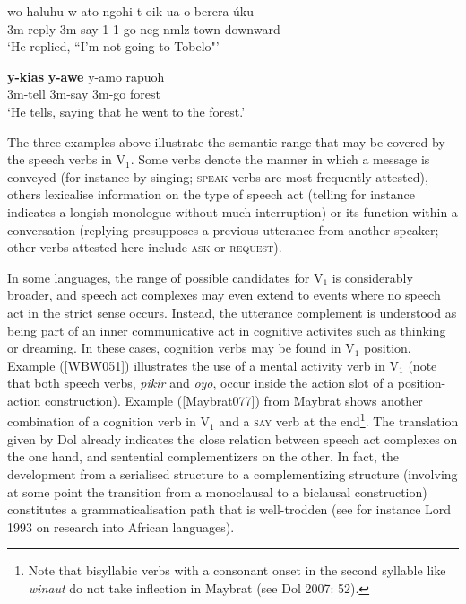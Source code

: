 \ea \label{Tobelo054}
\gll wo-haluhu w-ato ngohi t-oik-ua o-berera-úku \\
\acs{3}\acs{m}-reply \acs{3}\acs{m}-say \acs{1} \acs{1}-go-\acs{neg} \acs{nmlz}-town-downward \\
\glft `He replied, ``I'm not going to Tobelo"' \\ 
\z
\xe

\ea \label{Maybrat68}
\gll \textbf{y-kias} \textbf{y-awe} y-amo rapuoh \\
\acs{3}\acs{m}-tell \acs{3}\acs{m}-say \acs{3}\acs{m}-go forest \\
\glft `He tells, saying that he went to the forest.' \\ 
\z
\xe

The three examples above illustrate the semantic range that may be covered by the speech verbs in V$_{1}$. Some verbs denote the manner in which a message is conveyed (for instance by singing; \textsc{speak} verbs are most frequently attested), others lexicalise information on the type of speech act (telling for instance indicates a longish monologue without much interruption) or its function within a conversation (replying presupposes a previous utterance from another speaker; other verbs attested here include \textsc{ask} or \textsc{request}).

In some languages, the range of possible candidates for V$_{1}$ is considerably broader, and speech act complexes may even extend to events where no speech act in the strict sense occurs. Instead, the utterance complement is understood as being part of an inner communicative act in cognitive activites such as thinking or dreaming. In these cases, cognition verbs may be found in V$_{1}$ position. Example (\ref{WBW051}) illustrates the use of a mental activity verb in V$_{1}$ (note that both speech verbs, \textit{pikir} and \textit{oyo}, occur inside the action slot of a position-action construction). Example (\ref{Maybrat077}) from Maybrat shows another combination of a cognition verb in V$_{1}$ and a \textsc{say} verb at the end\footnote{Note that bisyllabic verbs with a consonant onset in the second syllable like \textit{winaut} do not take inflection in Maybrat (see Dol 2007: 52).}. The translation given by Dol already indicates the close relation between speech act complexes on the one hand, and sentential complementizers on the other. In fact, the development from a serialised structure to a complementizing structure (involving at some point the transition from a monoclausal to a biclausal construction) constitutes a grammaticalisation path that is well-trodden (see for instance Lord 1993 on research into African languages).

